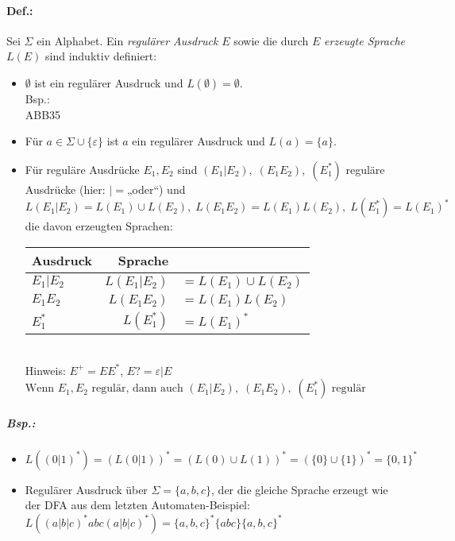 \paragraph{Def.:} Sei $\Sigma$ ein Alphabet. Ein \emph{regulärer Ausdruck} $E$ sowie die durch $E$ \emph{erzeugte Sprache $L(E)$} sind induktiv definiert:
\begin{itemize}
\item $\emptyset$ ist ein regulärer Ausdruck und $L(\emptyset)=\emptyset$.\\
Bsp.: \\
ABB35
\item Für $a \in \Sigma \cup \{\varepsilon\}$ ist $a$ ein regulärer Ausdruck und $L(a)=\{a\}$.
\item Für reguläre Ausdrücke $E_1, E_2$ sind $(E_1 | E_2), \; (E_1 E_2), \; (E_1^*)$ reguläre Ausdrücke (hier: $|=$„oder“) und $L(E_1|E_2)=L(E_1)\cup L(E_2), \; L(E_1E_2)=L(E_1)L(E_2), \; L(E_1^*)=L(E_1)^*$ die davon erzeugten Sprachen:\\
\begin{tabular}{l | r l}
Ausdruck & Sprache &\\
\hline
$E_1 | E_2$ & $L(E_1|E_2)$&$=L(E_1)\cup L(E_2)$\\
$E_1 E_2$ & $L(E_1E_2)$&$=L(E_1)L(E_2)$\\
$E_1^*$ & $L(E_1^*)$&$=L(E_1)^*$\\
\end{tabular}\medskip\\
Hinweis: $E^+=E E^*$, $E?=\varepsilon|E$\\
$\boxed{\text{Wenn }E_1, E_2 \text{ regulär, dann auch } (E_1 | E_2), \; (E_1 E_2), \; (E_1^*) \text{ regulär}}$
\end{itemize}
\subparagraph{Bsp.:} 
\begin{itemize}
\item $L( (0|1)^*) =(L(0|1))^*=(L(0)\cup L(1))^*=(\{0\}\cup\{1\})^*=\{0,1\}^*$
\item Regulärer Ausdruck über $\Sigma=\{a,b,c\}$, der die gleiche Sprache erzeugt wie der DFA aus dem letzten Automaten-Beispiel:\\
$L((a|b|c)^*abc(a|b|c)^*)=\{a,b,c\}^*\{abc\}\{a,b,c\}^*$
\end{itemize}

